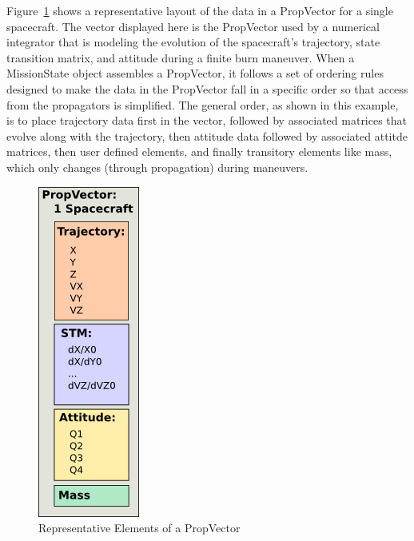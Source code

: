 
Figure~\ref{figure:PropVectorComponents} shows a representative layout of the data in a PropVector
for a single spacecraft.  The vector displayed here is the PropVector used by a numerical
integrator that is modeling the evolution of the spacecraft's trajectory, state transition matrix,
and attitude during a finite burn maneuver.  When a MissionState object assembles a PropVector, it
follows a set of ordering rules designed to make the data in the PropVector fall in a specific
order so that access from the propagators is simplified.  The general order, as shown in this
example, is to place trajectory data first in the vector, followed by associated matrices that
evolve along with the trajectory, then attitude data followed by associated attitde matrices, then
user defined elements, and finally transitory elements like mass, which only changes (through
propagation) during maneuvers.

\begin{figure}[htb]
\begin{center}
\includegraphics[63,207]{Images/PropVectorComponents.png}
\caption{\label{figure:PropVectorComponents}Representative Elements of a PropVector}
\end{center}
\end{figure}

